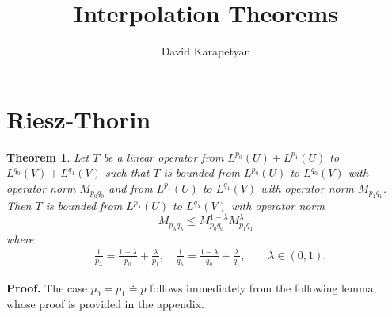 \documentclass[12pt,reqno]{amsart}
\numberwithin{equation}{section}  %
\numberwithin{figure}{section}
\theoremstyle{plain}
\newtheorem{theorem}{Theorem}
\theoremstyle{definition}
\theoremstyle{remark}
\begin{document}
\title{Interpolation Theorems}
\author{David Karapetyan}
\address{Department of Mathematics  \\
University  of Notre Dame\\
Notre Dame, IN 46556 }
\date{}
%
\maketitle
%
%
%
%
%
%
\section{Riesz-Thorin}
\label{sec:riesz-thorin}
%
%
%
%
%
%
%
%
\begin{theorem}
\label{thm:riesz-thorin} 
Let $T$ be a linear operator from $L^{p_{0}}(U) + L^{p_{1}}(U)$ to
$L^{q_{0}}(V) + L^{q_{1}}(V)$ such that $T$ is bounded
from $L^{p_0}(U)$ to $L^{q_0}(V)$ with operator norm $M_{p_{0}q_{0}}$ and from
$L^{p_{1}}(U)$ to $L^{q_1}(V)$ with operator norm $M_{p_{1}q_{1}}$. Then $T$ is
bounded from $L^{p_{\lambda}}(U)$ to $L^{q_{\lambda}}(V)$ with operator norm
%
%
\begin{equation}
\label{riesz-op-norm}
M_{p_{\lambda}q_{\lambda}} \le M_{p_{0}q_{0}}^{1-\lambda}M_{p_{1}q_{1}}^{\lambda}
\end{equation}
%
%
where 
%
%
\begin{equation}
\begin{split}
\label{riesz-op-norm-params}
& \frac{1}{p_\lambda}  = \frac{1-\lambda}{p_0} + \frac{\lambda}{p_1},
\quad  \frac{1}{q_\lambda} = \frac{1-\lambda}{q_0} + \frac{\lambda}{q_1}, \qquad
\lambda \in (0,1).
\end{split}
\end{equation}
%
%
%
%
\end{theorem}
%
%
{\bf Proof.} The case $p_0 = p_1 \doteq p$ follows immediately from the
following lemma, whose proof is provided in the appendix.
%
%
%
%
\end{document}
